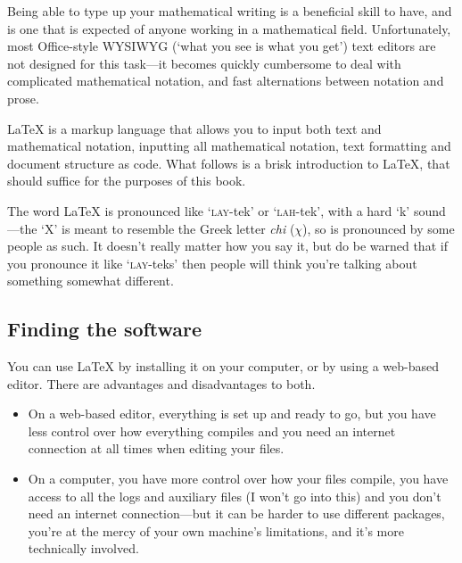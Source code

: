 
Being able to type up your mathematical writing is a beneficial skill to have, and is one that is expected of anyone working in a mathematical field. Unfortunately, most Office-style {\small WYSIWYG} (`what you see is what you get') text editors are not designed for this task---it becomes quickly cumbersome to deal with complicated mathematical notation, and fast alternations between notation and prose.

\LaTeX{} is a markup language that allows you to input both text and mathematical notation, inputting all mathematical notation, text formatting and document structure as code. What follows is a brisk introduction to \LaTeX{}, that should suffice for the purposes of this book.

The word \LaTeX{} is pronounced like `\textsc{lay}-tek' or `\textsc{lah}-tek', with a hard `k' sound---the `X' is meant to resemble the Greek letter \textit{chi} ($\chi$), so is pronounced by some people as such. It doesn't really matter how you say it, but do be warned that if you pronounce it like `\textsc{lay}-teks' then people will think you're talking about something somewhat different.

\subsection*{Finding the software}

You can use \LaTeX{} by installing it on your computer, or by using a web-based editor. There are advantages and disadvantages to both.

\begin{itemize}
\item On a web-based editor, everything is set up and ready to go, but you have less control over how everything compiles and you need an internet connection at all times when editing your files.
\item On a computer, you have more control over how your files compile, you have access to all the logs and auxiliary files (I won't go into this) and you don't need an internet connection---but it can be harder to use different packages, you're at the mercy of your own machine's limitations, and it's more technically involved.
\end{itemize}

